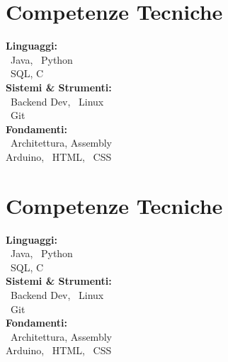 \documentclass[10pt,a4paper,sans]{moderncv}
\begin{document}
\begin{minipage}[t]{0.25\textwidth}
\section{Competenze Tecniche}
\textbf{Linguaggi:}\\
\faJava\ Java, \faPython\ Python\\
\faDatabase\ SQL, C\\[2mm]
\textbf{Sistemi \& Strumenti:}\\
\faServer\ Backend Dev, \faLinux\ Linux\\
\faGit\ Git\\[2mm]
\textbf{Fondamenti:}\\
\faMicrochip\ Architettura, Assembly\\
Arduino, \ HTML, \ CSS

\section{Competenze Tecniche}
\textbf{Linguaggi:}\\
\faJava\ Java, \faPython\ Python\\
\faDatabase\ SQL, C\\[2mm]
\textbf{Sistemi \& Strumenti:}\\
\faServer\ Backend Dev, \faLinux\ Linux\\
\faGit\ Git\\[2mm]
\textbf{Fondamenti:}\\
\faMicrochip\ Architettura, Assembly\\
Arduino, \ HTML, \ CSS

\end{minipage}
\end{document}

